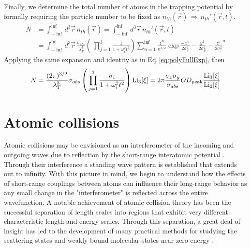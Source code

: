 Finally, we determine the total number of atoms in the trapping potential by formally requiring the particle number to be fixed as $n_{th}(\vec{r})\,\Rightarrow\,n_{th}'(\vec{r},t)$.
\begin{equation}
\begin{split}
	N&=\int_{-\inf}^{\inf} d^3\vec{r}\, n_{th}(\vec{r}) = \int_{-\inf}^{\inf} d^3\vec{r}\, n_{th}'(\vec{r},t) \\
&=\int_{-\inf}^{\inf} d^3\vec{r}\, \frac{\sigma_{abs}}{\lambda_T^3} \left( \, \prod_{j=1}^3 \frac{1}{1+\omega_i^2t^2}\right) \sum_{n=1}^{\inf} \frac{\xi^n}{n^{3/2}} \exp{\frac{-x^2}{2\sigma_x^2} - \frac{y^2}{2\sigma_y^2} - \frac{z^2}{2\sigma_z^2}}^n
\end{split}
\end{equation}
Applying the same expansion and identity as in Eq.\,\ref{eq:polyFullExp}, then
\begin{equation}
	N=\frac{(2\pi)^{3/2}}{\lambda_T^3}  \sigma_{abs} \left( \, \prod_{j=1}^3 \frac{\sigma_i}{1+\omega_i^2t^2}\right) \text{Li}_{3}\!\left[ \xi \right] 
	= 2\pi \frac{\sigma_x \sigma_y}{\sigma_{abs}} OD_{\text{peak}}\frac{\text{Li}_{3}\!\left[ \xi \right]}{\text{Li}_{2}\!\left[ \xi \right]}
\end{equation}

\section{Atomic collisions} \label{sec:cold_collisions}
Atomic collisions may be envisioned as an interferometer of the incoming and outgoing waves due to reflection by the short-range interatomic potential \cite{Jones2006}.
Through their interference a standing wave pattern is established that extends out to infinity.
With this picture in mind, we begin to understand how the effects of short-range couplings between atoms can influence their long-range behavior as any small change in the "interferometer" is reflected across the entire wavefunction. 
A notable achievement of atomic collision theory has been the successful separation of length scales into regions that exhibit very different characteristic length and energy scales.
Through this separation, a great deal of insight has led to the development of many practical methods for studying the scattering states and weakly bound molecular states near zero-energy \cite{wbz99,Gao01,gao04,Bohn1999,Julienne2009a,Vogels1998,Moerdijk1995,Julienne1989}.

